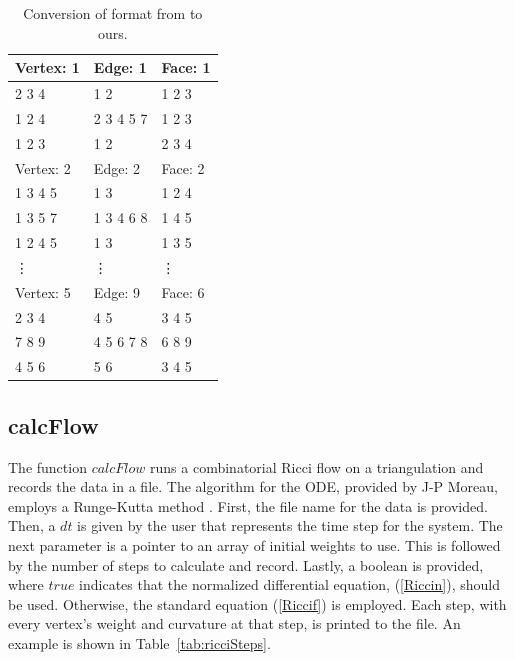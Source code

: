\documentclass[12pt]{article}
\begin{document}
\begin{table}
\begin{center}
\begin{tabular}{|l|l|l|}
\hline
 Vertex: 1 &    Edge: 1 &    Face: 1 \\ \hline 

     2 3 4 &        1 2 &     1 2 3  \\

    1 2 4  & 2 3 4 5 7  &     1 2 3  \\

    1 2 3  &       1 2  &     2 3 4  \\ \hline 

 Vertex: 2 &    Edge: 2 &    Face: 2 \\ \hline

   1 3 4 5 &        1 3 &     1 2 4  \\

  1 3 5 7  & 1 3 4 6 8  &     1 4 5  \\

  1 2 4 5  &       1 3  &     1 3 5  \\ \hline 

 			\vdots & \vdots & \vdots \\ \hline 

 Vertex: 5 &    Edge: 9 &    Face: 6 \\ \hline

     2 3 4 &        4 5 &     3 4 5  \\

    7 8 9  & 4 5 6 7 8  &     6 8 9  \\

     4 5 6 &       5 6  &     3 4 5  \\
\hline
\end{tabular}
\end{center}
\caption{Conversion of format from \cite{lutzmanifold} to ours.}
\label{tab:format}
\end{table}  

\subsection{calcFlow}

\noindent The function $calcFlow$ runs a combinatorial Ricci flow on a triangulation and records the data in a file. The algorithm for the ODE, provided by J-P Moreau, employs a Runge-Kutta method \cite{JPM}. First, the file name for the data is provided. Then, a $dt$ is given by the user that represents the time step for the system. The next parameter is a pointer to an array of initial weights to use. This is followed by the number of steps to calculate and record. Lastly, a boolean is provided, where $true$ indicates that the normalized differential equation, (\ref{Riccin}), should be used. Otherwise, the standard equation (\ref{Riccif}) is employed. Each step, with every vertex's weight and curvature at that step, is printed to the file. An example is shown in Table~\ref{tab:ricciSteps}.\newline
\end{document}
